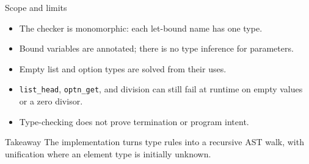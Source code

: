 \documentclass[aspectratio=169,11pt]{beamer}
\begin{document}
\begin{frame}{Scope and limits}
\begin{itemize}
  \item The checker is monomorphic: each let-bound name has one type.
  \item Bound variables are annotated; there is no type inference for parameters.
  \item Empty list and option types are solved from their uses.
  \item \texttt{list\_head}, \texttt{optn\_get}, and division can still fail at runtime on empty values or a zero divisor.
  \item Type-checking does not prove termination or program intent.
\end{itemize}
\begin{block}{Takeaway}
The implementation turns type rules into a recursive AST walk, with unification where an element type is initially unknown.
\end{block}
\end{frame}
\end{document}
